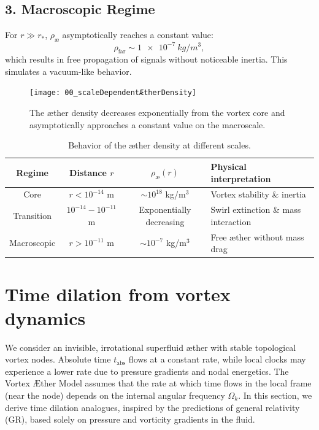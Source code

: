 \subsection*{3. Macroscopic Regime}

For \( r \gg r_* \), \( \rho_\text{\ae} \) asymptotically reaches a constant value:
\begin{equation}
    \rho_\text{far} \sim \SI{1e-7}{kg/m^3},
\end{equation}
which results in free propagation of signals without noticeable inertia. This simulates a vacuum-like behavior.

\begin{figure}[htbp]
    \centering
    \texttt{[image: 00\_scaleDependentÆtherDensity]}
    \caption{The æther density decreases exponentially from the vortex core and asymptotically approaches a constant value on the macroscale.}
    \label{fig:vortexfields2}
\end{figure}

\begin{table}[h!]
    \centering
    \begin{tabular}{|c|c|c|l|}
        \hline
        Regime & Distance $r$ & $\rho_\text{\ae}(r)$ & Physical interpretation \\
        \hline
        Core & $r < 10^{-14}$ m & $\sim 10^{18}$ kg/m$^3$ & Vortex stability \& inertia \\
        Transition & $10^{-14} - 10^{-11}$ m & Exponentially decreasing & Swirl extinction \& mass interaction \\
        Macroscopic & $r > 10^{-11}$ m & $\sim 10^{-7}$ kg/m$^3$ & Free æther without mass drag \\
        \hline
    \end{tabular}
    \caption{Behavior of the æther density at different scales.}
\end{table}


\section{Time dilation from vortex dynamics}

We consider an invisible, irrotational superfluid æther with stable topological vortex nodes. Absolute time $t_\text{abs}$ flows at a constant rate, while local clocks may experience a lower rate due to pressure gradients and nodal energetics. The Vortex Æther Model assumes that the rate at which time flows in the local frame (near the node) depends on the internal angular frequency $\Omega_k$. In this section, we derive time dilation analogues, inspired by the predictions of general relativity (GR), based solely on pressure and vorticity gradients in the fluid.

